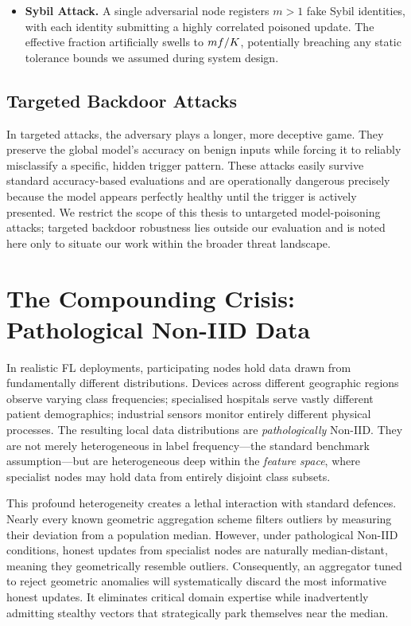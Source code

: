 \documentclass[../main.tex]{subfiles}
\begin{document}
\begin{itemize}
    \item \textbf{Sybil Attack.}
    A single adversarial node registers $m > 1$ fake Sybil identities, with each identity submitting a highly correlated poisoned update. The effective \byz{} fraction artificially swells to $mf/K$, potentially breaching any static tolerance bounds we assumed during system design.
\end{itemize}

\subsection{Targeted Backdoor Attacks}
\label{sec:intro_targeted}

In targeted attacks, the adversary plays a longer, more deceptive game. They preserve the global model's accuracy on benign inputs while forcing it to reliably misclassify a specific, hidden trigger pattern. These attacks easily survive standard accuracy-based evaluations and are operationally dangerous precisely because the model appears perfectly healthy until the trigger is actively presented. We restrict the scope of this thesis to untargeted model-poisoning attacks; targeted backdoor robustness lies outside our evaluation and is noted here only to situate our work within the broader threat landscape.

\section{The Compounding Crisis: Pathological Non-IID Data}
\label{sec:intro_noniid}

In realistic FL deployments, participating nodes hold data drawn from fundamentally different distributions. Devices across different geographic regions observe varying class frequencies; specialised hospitals serve vastly different patient demographics; industrial sensors monitor entirely different physical processes. The resulting local data distributions are \emph{pathologically} Non-IID. They are not merely heterogeneous in label frequency---the standard benchmark assumption---but are heterogeneous deep within the \emph{feature space}, where specialist nodes may hold data from entirely disjoint class subsets.

This profound heterogeneity creates a lethal interaction with standard \byz{} defences. Nearly every known geometric aggregation scheme \citep{blanchard2017machine,yin2018byzantine} filters outliers by measuring their deviation from a population median. However, under pathological Non-IID conditions, honest updates from specialist nodes are naturally median-distant, meaning they geometrically resemble outliers. Consequently, an aggregator tuned to reject geometric anomalies will systematically discard the most informative honest updates. It eliminates critical domain expertise while inadvertently admitting stealthy \byz{} vectors that strategically park themselves near the median.
\end{document}
